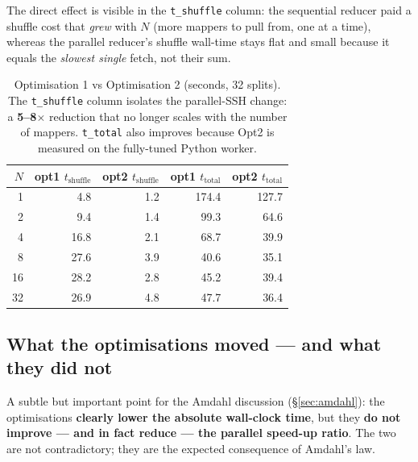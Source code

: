 \documentclass[11pt,a4paper]{article}
\newcommand{\code}[1]{\texttt{\small #1}}
\begin{document}
The direct effect is visible in the \code{t\_shuffle} column: the sequential
reducer paid a shuffle cost that \emph{grew} with $N$ (more mappers to pull from,
one at a time), whereas the parallel reducer's shuffle wall-time stays flat and
small because it equals the \emph{slowest single} fetch, not their sum.

\begin{table}[H]
\centering
\small
\renewcommand{\arraystretch}{1.2}
\begin{tabular}{@{}rrrrr@{}}
\toprule
$N$ & opt1 $t_{\text{shuffle}}$ & opt2 $t_{\text{shuffle}}$ & opt1 $t_{\text{total}}$ & opt2 $t_{\text{total}}$\\
\midrule
1  &  4.8 & 1.2 & 174.4 & 127.7\\
2  &  9.4 & 1.4 &  99.3 &  64.6\\
4  & 16.8 & 2.1 &  68.7 &  39.9\\
8  & 27.6 & 3.9 &  40.6 &  35.1\\
16 & 28.2 & 2.8 &  45.2 &  39.4\\
32 & 26.9 & 4.8 &  47.7 &  36.4\\
\bottomrule
\end{tabular}
\caption{Optimisation 1 vs Optimisation 2 (seconds, 32 splits). The
\code{t\_shuffle} column isolates the parallel-SSH change: a \textbf{5--8$\times$}
reduction that no longer scales with the number of mappers. \code{t\_total} also
improves because Opt2 is measured on the fully-tuned Python worker.}
\end{table}

\subsection{What the optimisations moved --- and what they did not}
\label{sec:opt-scaling}

A subtle but important point for the Amdahl discussion (\S\ref{sec:amdahl}): the
optimisations \textbf{clearly lower the absolute wall-clock time}, but they
\textbf{do not improve --- and in fact reduce --- the parallel speed-up ratio}.
The two are not contradictory; they are the expected consequence of Amdahl's law.
\end{document}
